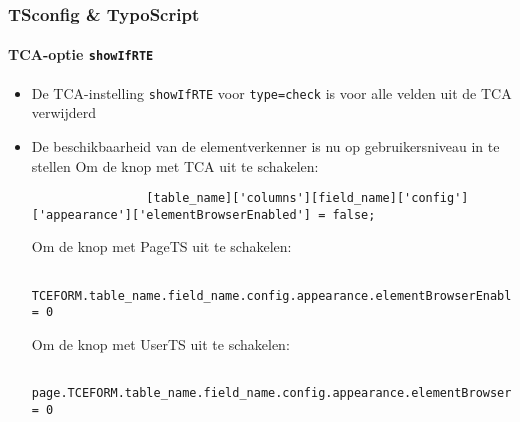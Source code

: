 \begin{frame}[fragile]
	\frametitle{TSconfig \& TypoScript}
	\framesubtitle{TCA-optie \texttt{showIfRTE}}

	\lstset{basicstyle=\tiny\ttfamily}

	\begin{itemize}
		\item De TCA-instelling \texttt{showIfRTE} voor \texttt{type=check} is voor alle velden
			uit de TCA verwijderd
		\item De beschikbaarheid van de elementverkenner is nu op gebruikersniveau in te stellen\newline
			\smaller
				Om de knop met TCA uit te schakelen:
			\normalsize

			\begin{lstlisting}
				[table_name]['columns'][field_name]['config']['appearance']['elementBrowserEnabled'] = false;
			\end{lstlisting}

			\smaller
				Om de knop met PageTS uit te schakelen:
			\normalsize

			\begin{lstlisting}
				TCEFORM.table_name.field_name.config.appearance.elementBrowserEnabled = 0
			\end{lstlisting}

			\smaller
				Om de knop met UserTS uit te schakelen:
			\normalsize

			\begin{lstlisting}
				page.TCEFORM.table_name.field_name.config.appearance.elementBrowserEnabled = 0
			\end{lstlisting}

	\end{itemize}

\end{frame}



